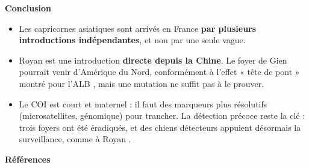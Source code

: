 \documentclass{article}
\newcommand{\bloc}[2]{{\titre\fontsize{54}{62}\selectfont\bfseries\color{theme}#1\par}\vspace{-2pt}{\color{theme!35}\rule{\linewidth}{2pt}}\par\vspace{6pt}#2}
\begin{document}
\begin{minipage}[t]{751mm}
\vspace{18mm}
\begin{minipage}[t]{470mm}
\bloc{Conclusion}{%
\begin{itemize}
\item Les capricornes asiatiques sont arrivés en France \textbf{par plusieurs introductions indépendantes}, et non par une seule vague.
\item Royan est une introduction \textbf{directe depuis la Chine}. Le foyer de Gien pourrait venir d'Amérique du Nord, conformément à l'effet « tête de pont » montré pour l'ALB \parencite{javal2019}, mais une mutation ne suffit pas à le prouver.
\item Le COI est court et maternel : il faut des marqueurs plus résolutifs (microsatellites, génomique) pour trancher. La détection précoce reste la clé : trois foyers ont été éradiqués, et des chiens détecteurs appuient désormais la surveillance, comme à Royan \parencite{anses2019}.
\end{itemize}}
\end{minipage}\hfill
\begin{minipage}[t]{258mm}
\bloc{Références}{\fontsize{22}{28}\selectfont
\printbibliography[heading=none]
}
\end{minipage}

\end{minipage}
\end{document}
